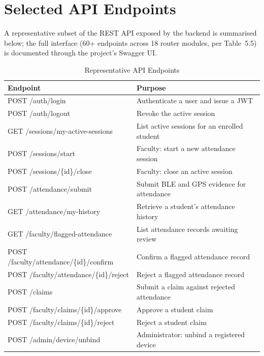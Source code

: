 \documentclass[12pt, a4paper, oneside]{report}
\begin{document}
\appendix

\chapter{Selected API Endpoints}
\label{app:api-endpoints}

A representative subset of the REST API exposed by the backend is summarised below; the full interface (60+ endpoints across 18 router modules, per Table~5.5) is documented through the project's Swagger UI.

\begin{table}[htbp]
\centering
\caption{Representative API Endpoints}
\label{tab:api-endpoints}
\begin{tabularx}{\textwidth}{|l|X|}
\hline
\textbf{Endpoint} & \textbf{Purpose} \\
\hline
POST /auth/login & Authenticate a user and issue a JWT \\
\hline
POST /auth/logout & Revoke the active session \\
\hline
GET /sessions/my-active-sessions & List active sessions for an enrolled student \\
\hline
POST /sessions/start & Faculty: start a new attendance session \\
\hline
POST /sessions/\{id\}/close & Faculty: close an active session \\
\hline
POST /attendance/submit & Submit BLE and GPS evidence for attendance \\
\hline
GET /attendance/my-history & Retrieve a student's attendance history \\
\hline
GET /faculty/flagged-attendance & List attendance records awaiting review \\
\hline
POST /faculty/attendance/\{id\}/confirm & Confirm a flagged attendance record \\
\hline
POST /faculty/attendance/\{id\}/reject & Reject a flagged attendance record \\
\hline
POST /claims & Submit a claim against rejected attendance \\
\hline
POST /faculty/claims/\{id\}/approve & Approve a student claim \\
\hline
POST /faculty/claims/\{id\}/reject & Reject a student claim \\
\hline
POST /admin/device/unbind & Administrator: unbind a registered device \\
\hline
\end{tabularx}
\end{table}
\end{document}
